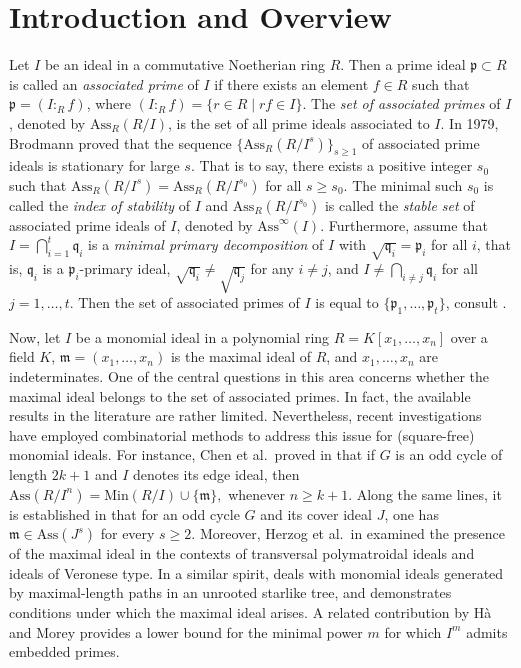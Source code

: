 \documentclass[11pt]{amsart}
\begin{document}
 
\section{Introduction and Overview}



Let $I$ be an ideal in a  commutative  Noetherian ring $R$. Then a prime ideal $\mathfrak{p}\subset  R$ is called an {\it associated prime} of $I$ if there exists an element $f\in R$  such that $\mathfrak{p}=(I:_R f)$, where $(I:_R f)=\{r\in R \mid  rf\in I\}$. The  {\it set of associated primes} of $I$, denoted by  $\mathrm{Ass}_R(R/I)$, is the set of all prime ideals associated to  $I$. In 1979,  Brodmann \cite{BR} proved  that the sequence $\{\mathrm{Ass}_R(R/I^s)\}_{s \geq 1}$ of associated prime ideals is stationary  for large $s$. That is to say, there exists a positive integer $s_0$ such that $\mathrm{Ass}_R(R/I^s)=\mathrm{Ass}_R(R/I^{s_0})$ for all $s\geq s_0$. The  minimal such $s_0$ is called the {\it index of stability}   of  $I$ and $\mathrm{Ass}_R(R/I^{s_0})$ is called the {\it stable set } 
 of associated prime ideals of  $I$,  denoted by $\mathrm{Ass}^{\infty }(I).$ Furthermore, assume that  $I=\bigcap_{i=1}^t\mathfrak{q}_i$ is 
  a \textit{minimal primary decomposition} of $I$ with $\sqrt{\mathfrak{q}_i}=\mathfrak{p}_i$ for all $i$,  that is, $\mathfrak{q}_i$ is a $\mathfrak{p}_i$-primary ideal, 
  $\sqrt{\mathfrak{q}_i}\neq \sqrt{\mathfrak{q}_j}$ for any $i\neq j$, and $I\neq \bigcap_{i\neq j}\mathfrak{q}_i$ for all $j =1, \ldots, t$. Then the  set of
  associated primes of  $I$ is equal to $\{\mathfrak{p}_1, \ldots, \mathfrak{p}_t\}$, consult  \cite[Theorem 4.5]{Atiyah}. 
 
 Now, let  $I$ be  a monomial  ideal  in a polynomial ring $R=K[x_1,\ldots,x_n]$ over a field $K$, $\mathfrak{m}=(x_1, \ldots, x_n)$ is  the  maximal ideal of $R$, and $x_1,\ldots,x_n$ are indeterminates.  
 One of the central questions in this area concerns whether the maximal ideal belongs to the set of associated primes. In fact, the available results in the literature are rather limited. Nevertheless, recent investigations have employed combinatorial methods to address this issue for (square-free) monomial ideals.  
For instance, Chen et al.\ proved in \cite[Lemma 3.1]{CMS} that if $G$ is an odd cycle of length $2k+1$ and $I$ denotes its edge ideal, then  
 $\mathrm{Ass}(R/I^n) = \mathrm{Min}(R/I)\cup \{\mathfrak{m}\},$ whenever $n \geq k+1.$   
Along the same lines, it is established in \cite[Proposition 3.6]{NKA} that for an odd cycle $G$ and its cover ideal $J$, one has $\mathfrak{m}\in \mathrm{Ass}(J^s)$ for every $s\geq 2$. 
Moreover, Herzog et al.\ in \cite[Corollaries 4.5 and 5.5]{HRV} examined the presence of the maximal ideal in the contexts of transversal polymatroidal ideals and ideals of Veronese type. In a similar spirit, \cite[Theorem 2.10]{N3} deals with monomial ideals generated by maximal-length paths in an unrooted starlike tree, and demonstrates conditions under which the maximal ideal arises. A related contribution by H\`a and Morey \cite[Corollary 3.6]{HM} provides a lower bound for the minimal power $m$ for which $I^m$ admits embedded primes.  
\end{document}
